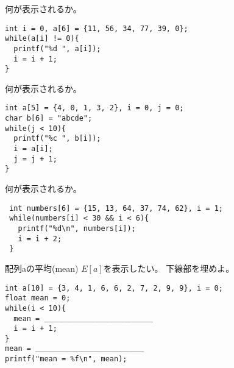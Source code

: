 \documentclass[12pt,a4j]{jarticle}
\newcounter{toi}
\def\toi{%
\bigskip\bigskip\noindent
\addtocounter{toi}{1}
\shadowbox{\bfseries\large 問\thetoi}
\nopagebreak[4]\bigskip\nopagebreak[4]
}
\begin{document}





\toi


何が表示されるか。
\begin{verbatim}
int i = 0, a[6] = {11, 56, 34, 77, 39, 0};
while(a[i] != 0){
  printf("%d ", a[i]);
  i = i + 1;
}
\end{verbatim}





\toi

何が表示されるか。

\begin{verbatim}
int a[5] = {4, 0, 1, 3, 2}, i = 0, j = 0;
char b[6] = "abcde";
while(j < 10){
  printf("%c ", b[i]);
  i = a[i];
  j = j + 1;
}	
\end{verbatim}






\toi

何が表示されるか。
\begin{verbatim}
 int numbers[6] = {15, 13, 64, 37, 74, 62}, i = 1;
 while(numbers[i] < 30 && i < 6){
   printf("%d\n", numbers[i]);
   i = i + 2;
 }
\end{verbatim}








\toi

配列{\ttfamily a}の平均(mean) $E[a]$を表示したい。
下線部を埋めよ。
\begin{verbatim}
int a[10] = {3, 4, 1, 6, 6, 2, 7, 2, 9, 9}, i = 0;
float mean = 0;
while(i < 10){
  mean = ＿＿＿＿＿＿＿＿＿＿＿＿＿＿＿
  i = i + 1;
}
mean = ＿＿＿＿＿＿＿＿＿＿＿＿＿＿＿
printf("mean = %f\n", mean);
\end{verbatim}


\end{document}
